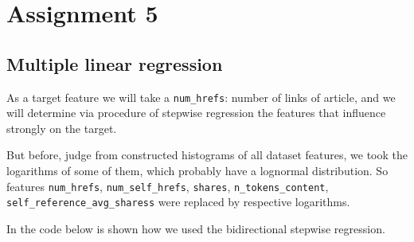 \section{Assignment 5}
\subsection{Multiple linear regression}
As a target feature we will take a \texttt{num\_hrefs}: number of links of article, and we will determine via procedure of stepwise regression the features that influence strongly on the target. 

But before, judge from constructed histograms of all dataset features, we took the logarithms of some of them, which probably have a lognormal distribution. So features \texttt{num\_hrefs}, \texttt{num\_self\_hrefs}, \texttt{shares}, \texttt{n\_tokens\_content}, \texttt{self\_reference\_avg\_sharess} were replaced by respective logarithms. 

In the code below is shown how we used the bidirectional stepwise regression.

